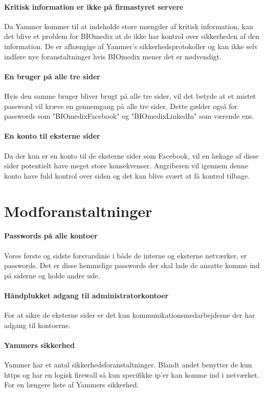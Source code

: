\documentclass{article}
\begin{document}
\paragraph{Kritisk information er ikke på firmastyret servere}
Da Yammer kommer til at indeholde store mængder af kritisk information,
kan det blive et problem for BIOmedix at de ikke har kontrol over
sikkerheden af den information. De er afhængige af Yammer's 
sikkerhedsprotokoller og kan ikke selv indføre nye foranstaltninger hvis
BIOmedix mener det er nødvendigt.

\paragraph{En bruger på alle tre sider}
Hvis den samme bruger bliver brugt på alle tre sider, vil det betyde
at et mistet password vil kræve en gennemgang på alle tre sider. Dette
gælder også for passwords som "BIOmedixFacebook" og "BIOmedixLinkedIn" 
som værende ens.

\paragraph{En konto til eksterne sider}
Da der kun er en konto til de eksterne sider som Facebook, vil en
lækage af disse sider potentielt have meget store konsekvenser.
Angriberen vil igennem denne konto have fuld kontrol over siden
og det kan blive svært at få kontrol tilbage.

\section{Modforanstaltninger}

\paragraph{Passwords på alle kontoer}
Vores første og sidste forsvarslinie i både de interne og eksterne
netværker, er passwords. Det er disse hemmelige passwords der skal
lade de ansatte komme ind på siderne og holde andre ude. 

\paragraph{Håndplukket adgang til administratorkontoer}
For at sikre de eksterne sider er det kun kommunikationsmedarbejderne der har 
adgang til kontoerne.

\paragraph{Yammers sikkerhed}
Yammer har et antal sikkerhedsforanstaltninger. Blandt andet benytter de
kun https og har en logisk firewall så kun specifikke ip'er kan komme ind
i netværket. For en længere liste af Yammers sikkerhed\cite{YammerSec}. 
\end{document}
